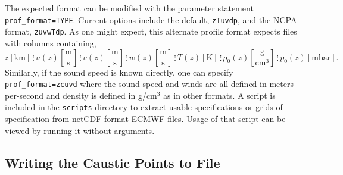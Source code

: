 \documentclass[10pt]{article}
\begin{document}
\hspace{0.25in} The expected format can be modified with the parameter statement \verb#prof_format=TYPE#.  Current options include the default, \verb#zTuvdp#, and the NCPA format, \verb#zuvwTdp#.  As one might expect, this alternate profile format expects files with columns containing,
\begin{equation*} 
 z \left[ \text{km} \right] \hspace{2pt} \vdots \hspace{2pt}
 u(z) \left[ \frac{\text{m}}{\text{s}} \right] \hspace{2pt} \vdots \hspace{2pt}
 v(z) \left[ \frac{\text{m}}{\text{s}} \right] \hspace{2pt} \vdots \hspace{2pt}
 w(z) \left[ \frac{\text{m}}{\text{s}} \right] \hspace{2pt} \vdots \hspace{2pt}
 T(z) \left[ \text{K} \right] \hspace{2pt} \vdots \hspace{2pt}
 \rho_0(z) \left[ \frac{\text{g}}{\text{cm}^3} \right] \hspace{2pt} \vdots \hspace{2pt}
 p_0(z) \left[ \text{mbar} \right] .
\end{equation*}
Similarly, if the sound speed is known directly, one can specify \verb#prof_format=zcuvd# where the sound speed and winds are all defined in meters-per-second and density is defined in g/cm\(^3\) as in other formats.  A script is included in the \verb=scripts= directory to extract usable specifications or grids of specification from netCDF format ECMWF files.  Usage of that script can be viewed by running it without arguments.

\subsection{Writing the Caustic Points to File}
\label{Sect:AdditionalParams:write_caustics}
\end{document}
